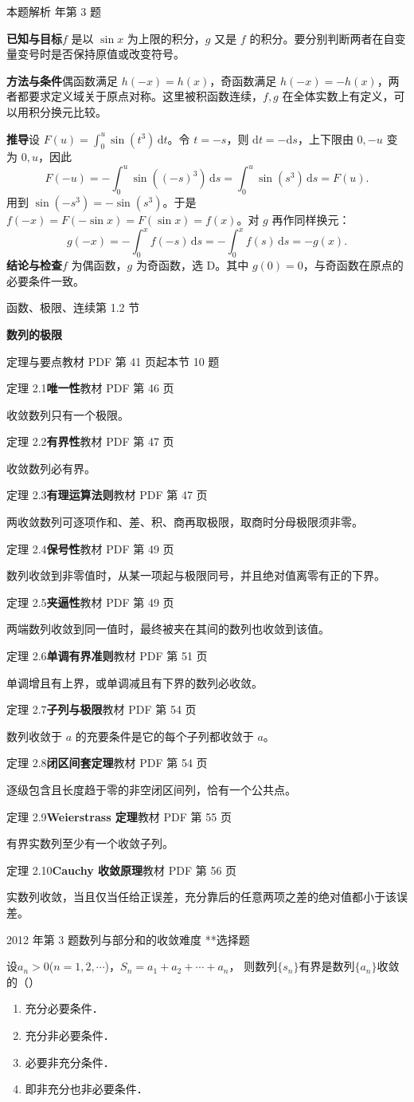 \documentclass[UTF8,zihao=-4,fontset=fandol]{ctexart}
\newcommand{\SectionHeading}[4]{%
  \clearpage\hypertarget{sec-#1}{}%
  {\small\textcolor{accent}{#2\hfill 第 #1 节}}\par\medskip
  {\LARGE\bfseries #3}\par\smallskip
  {\small\textcolor{muted}{#4}}\par\bigskip}
\newcommand{\Theory}[4]{%
  {\small\textcolor{accent}{#1}\quad\textbf{#3}\hfill\textcolor{muted}{教材 PDF 第 #2 页}}\par
  {\small #4}\par\smallskip}
\newcommand{\pickout}{\hfill（\hspace{1.4em}）}
\newenvironment{abcd}{\begin{enumerate}[label=\textup{(\Alph*)},leftmargin=2.3em,itemsep=1pt,topsep=4pt,parsep=1pt]}{\end{enumerate}}
\newcounter{BankQuestion}
\newcommand{\QuestionPage}[7]{%
  \stepcounter{BankQuestion}%
  \par\noindent\begin{minipage}{\linewidth}
  \raggedright
  {\small\textcolor{black!60}{#3\quad #5\quad 难度 #7}\hfill\textcolor{accent}{#2}}\par\smallskip}
\newcommand{\QuestionEnd}{\end{minipage}\par\medskip}
\newcommand{\QuestionPage}[7]{%
  \clearpage
  \stepcounter{BankQuestion}%
  {\small\textcolor{accent}{#1\hfill #2}}\par\medskip
  {\small\textcolor{black!60}{#3\quad #5\quad 难度 #7\hfill \arabic{BankQuestion} / 234}}\par\vspace{9bp}}
\newcommand{\QuestionEnd}{}
\newenvironment{QuestionSolution}[1]{%
  \clearpage
  {\small\textcolor{black!60}{本题解析\quad #1}}\par\medskip
}{\par\clearpage}
\begin{document}
\begin{QuestionSolution}{2024 年第 3 题}
\textbf{已知与目标}\quad \(f\) 是以 \(\sin x\) 为上限的积分，\(g\) 又是 \(f\) 的积分。要分别判断两者在自变量变号时是否保持原值或改变符号。

\textbf{方法与条件}\quad 偶函数满足 \(h(-x)=h(x)\)，奇函数满足 \(h(-x)=-h(x)\)，两者都要求定义域关于原点对称。这里被积函数连续，\(f,g\) 在全体实数上有定义，可以用积分换元比较。

\textbf{推导}\quad 设 \(F(u)=\int_0^u\sin(t^3)\,\mathrm{d}t\)。令 \(t=-s\)，则 \(\mathrm{d}t=-\mathrm{d}s\)，上下限由 \(0,-u\) 变为 \(0,u\)，因此
\[
F(-u)=-\int_0^u\sin((-s)^3)\,\mathrm{d}s
=\int_0^u\sin(s^3)\,\mathrm{d}s=F(u).
\]
用到 \(\sin(-s^3)=-\sin(s^3)\)。于是 \(f(-x)=F(-\sin x)=F(\sin x)=f(x)\)。对 \(g\) 再作同样换元：
\[
g(-x)=-\int_0^x f(-s)\,\mathrm{d}s=-\int_0^x f(s)\,\mathrm{d}s=-g(x).
\]
\textbf{结论与检查}\quad \(f\) 为偶函数，\(g\) 为奇函数，选 \(\boxed{\mathrm D}\)。其中 \(g(0)=0\)，与奇函数在原点的必要条件一致。
\end{QuestionSolution}

\SectionHeading{1.2}{函数、极限、连续}{数列的极限}{定理与要点\quad 教材 PDF 第 41 页起\hfill 本节 10 题}
\Theory{定理 2.1}{46}{唯一性}{收敛数列只有一个极限。}
\Theory{定理 2.2}{47}{有界性}{收敛数列必有界。}
\Theory{定理 2.3}{47}{有理运算法则}{两收敛数列可逐项作和、差、积、商再取极限，取商时分母极限须非零。}
\Theory{定理 2.4}{49}{保号性}{数列收敛到非零值时，从某一项起与极限同号，并且绝对值离零有正的下界。}
\Theory{定理 2.5}{49}{夹逼性}{两端数列收敛到同一值时，最终被夹在其间的数列也收敛到该值。}
\Theory{定理 2.6}{51}{单调有界准则}{单调增且有上界，或单调减且有下界的数列必收敛。}
\Theory{定理 2.7}{54}{子列与极限}{数列收敛于 \(a\) 的充要条件是它的每个子列都收敛于 \(a\)。}
\Theory{定理 2.8}{54}{闭区间套定理}{逐级包含且长度趋于零的非空闭区间列，恰有一个公共点。}
\Theory{定理 2.9}{55}{Weierstrass 定理}{有界实数列至少有一个收敛子列。}
\Theory{定理 2.10}{56}{Cauchy 收敛原理}{实数列收敛，当且仅当任给正误差，充分靠后的任意两项之差的绝对值都小于该误差。}
\QuestionPage{1.2 数列的极限}{选择题}{2012 年第 3 题}{1}{数列与部分和的收敛}{002 / 234}{**}
设$a_n > 0$($n = 1,2, \cdots$)，$S_n = a_1 + a_2 + \cdots + a_n$，
则数列$\{s_n\}$有界是数列$\{a_n\}$收敛的\pickout{}
\begin{abcd}
\item 充分必要条件．
\item 充分非必要条件．
\item 必要非充分条件．
\item 即非充分也非必要条件．
\end{abcd}
\QuestionEnd
\end{document}
